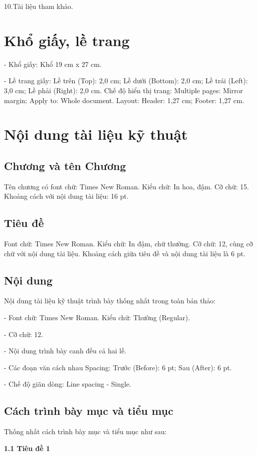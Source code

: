 \hspace{0.5 cm}10.Tài liệu tham khảo.

\section{Khổ giấy, lề trang}
- Khổ giấy: Khổ 19 cm x 27 cm.

- Lề trang giấy: Lề trên (Top): 2,0 cm; Lề dưới (Bottom): 2,0 cm; Lề trái (Left): 3,0 cm; Lề phải (Right): 2,0 cm. Chế độ hiển thị trang: Multiple pages: Mirror margin; Apply to: Whole document. Layout: Header: 1,27 cm; Footer: 1,27 cm. 
\section{Nội dung tài liệu kỹ thuật}
\subsection{Chương và tên Chương}
Tên chương có font chữ: Times New Roman. Kiểu chữ: In hoa, đậm. Cỡ chữ: 15. Khoảng cách với nội dung tài liệu: 16 pt. 
\subsection{Tiêu đề}
Font chữ: Times New Roman. Kiểu chữ: In đậm, chữ thường. Cỡ chữ: 12, cùng cỡ chữ với nội dung tài liệu. Khoảng cách giữa tiêu đề và nội dung tài liệu là 6 pt.
\subsection{Nội dung}
Nội dung tài liệu kỹ thuật trình bày thống nhất trong toàn bản thảo:

- Font chữ: Times New Roman. Kiểu chữ: Thường (Regular). 

- Cỡ chữ: 12. 

- Nội dung trình bày canh đều cả hai lề.

- Các đoạn văn cách nhau Spacing: Trước (Before): 6 pt; Sau (After): 6 pt.

- Chế độ giãn dòng: Line spacing - Single.

\subsection{Cách trình bày mục và tiểu mục}

Thống nhất cách trình bày mục và tiểu mục như sau:

\noindent\textbf{1.1 Tiêu đề 1}

